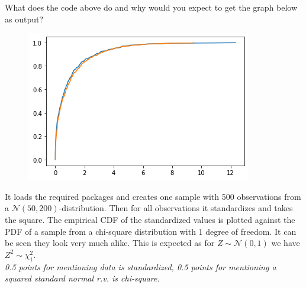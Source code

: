 \begin{exercise}[1]
What does the code above do and why would you expect to get the graph below as output?
\begin{figure}[H]
    \centering
    \includegraphics[scale = 0.5]{examplot.png}
\end{figure}
\begin{solution}
It loads the required packages and creates one sample with 500 observations from a $\mathcal{N}(50, 200)$-distribution. Then for all observations it standardizes and takes the square. The empirical CDF of the standardized values is plotted against the PDF of a sample from a chi-square distribution with 1 degree of freedom. It can be seen they look very much alike. This is expected as for $Z \sim \mathcal{N}(0,1)$ we have $Z^2 \sim \chi^2_1$. \\
\textit{0.5 points for mentioning data is standardized, 0.5 points for mentioning a squared standard normal r.v. is chi-square.}
\end{solution}
\end{exercise}
